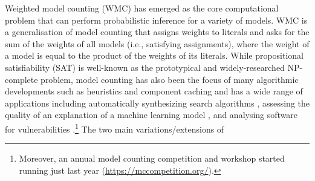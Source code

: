 \documentclass{article}
\begin{document}
Weighted model counting (WMC) has emerged as the core computational problem
that can perform probabilistic inference for a variety of models. WMC
\cite{DBLP:journals/ai/ChaviraD08} is a generalisation of model counting that
assigns weights to literals and asks for the sum of the weights of all models
(i.e., satisfying assignments), where the weight of a model is equal to the
product of the weights of its literals. While propositional satisfiability (SAT)
is well-known as the prototypical and widely-researched NP-complete problem,
model counting has also been the focus of many algorithmic developments such as
heuristics and component caching \cite{DBLP:conf/ijcai/SharmaRSM19} and has a
wide range of applications including automatically synthesizing search
algorithms \cite{DBLP:journals/corr/abs-2009-10877}, assessing the quality of an
explanation of a machine learning model \cite{DBLP:conf/sat/NarodytskaSMIM19},
and analysing software for vulnerabilities
\cite{DBLP:conf/sp/ZhouQRZ18}.\footnote{Moreover, an annual model counting
  competition and workshop started running just last year
  (\url{https://mccompetition.org/}).} The two main variations/extensions of
\end{document}
